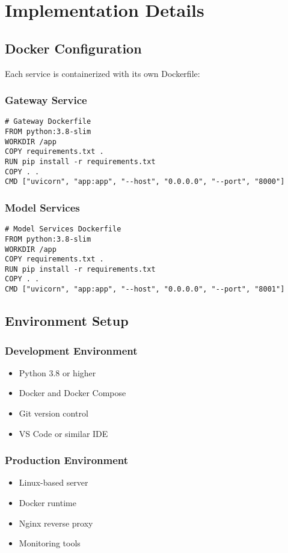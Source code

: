 \documentclass[12pt,a4paper]{report}
\begin{document}
\section{Implementation Details}
\subsection{Docker Configuration}
Each service is containerized with its own Dockerfile:

\subsubsection{Gateway Service}
\begin{lstlisting}
# Gateway Dockerfile
FROM python:3.8-slim
WORKDIR /app
COPY requirements.txt .
RUN pip install -r requirements.txt
COPY . .
CMD ["uvicorn", "app:app", "--host", "0.0.0.0", "--port", "8000"]
\end{lstlisting}

\subsubsection{Model Services}
\begin{lstlisting}
# Model Services Dockerfile
FROM python:3.8-slim
WORKDIR /app
COPY requirements.txt .
RUN pip install -r requirements.txt
COPY . .
CMD ["uvicorn", "app:app", "--host", "0.0.0.0", "--port", "8001"]
\end{lstlisting}

\subsection{Environment Setup}
\subsubsection{Development Environment}
\begin{itemize}
    \item Python 3.8 or higher
    \item Docker and Docker Compose
    \item Git version control
    \item VS Code or similar IDE
\end{itemize}

\subsubsection{Production Environment}
\begin{itemize}
    \item Linux-based server
    \item Docker runtime
    \item Nginx reverse proxy
    \item Monitoring tools
\end{itemize}
\end{document}
